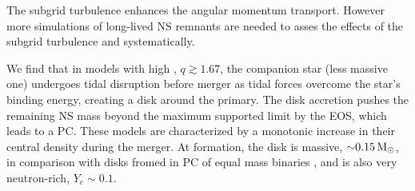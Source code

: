 The subgrid turbulence enhances the angular momentum transport. 
However more simulations of long-lived 
\ac{NS} remnants are needed to asses the effects of the 
subgrid turbulence and \mr{} systematically. 





We find that in models with high \mr{}, $q\gtrsim1.67$, the companion star (less 
massive one) undergoes tidal disruption before merger as tidal forces overcome the star's 
binding energy, creating a disk around the primary.
The disk accretion pushes the remaining \ac{NS} mass beyond the 
maximum supported limit by the \ac{EOS}, which leads to a \ac{PC}. 
These models are characterized by a monotonic increase in their 
central density during the merger.
%
At formation, the disk is massive, ${\sim}0.15\,{\text{M}_{\odot}}$, in comparison with 
disks fromed in \ac{PC} of equal mass binaries \citep[\eg][]{Radice:2018pdn}, 
and is also very neutron-rich, $Y_e\sim 0.1$.  
%



